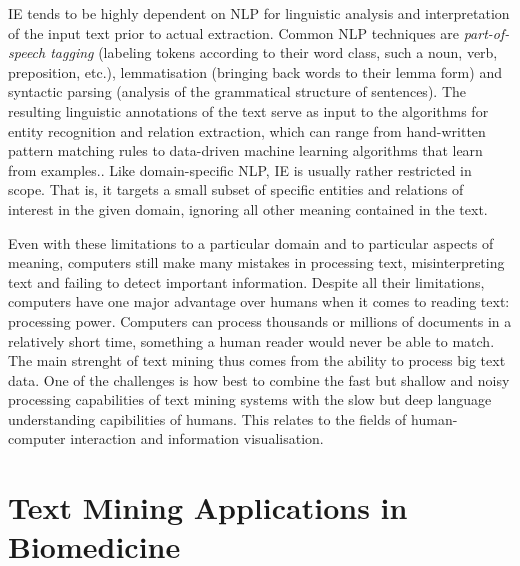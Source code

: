 IE tends to be highly dependent on NLP for linguistic analysis and interpretation of the input text prior to actual extraction.
Common NLP techniques are \emph{part-of-speech tagging} (labeling tokens according to their word class, such a noun, verb, preposition, etc.), lemmatisation (bringing back words to their lemma form) and syntactic parsing (analysis of the grammatical structure of sentences).
The resulting linguistic annotations of the text serve as input to the algorithms for entity recognition and relation extraction, which can range from hand-written pattern matching rules to data-driven machine learning algorithms that learn from examples..
Like domain-specific NLP, IE is usually rather restricted in scope.
That is, it targets a small subset of specific entities and relations of interest in the given domain, ignoring all other meaning contained in the text.    

Even with these limitations to a particular domain and to particular aspects of meaning, computers still make many mistakes in processing text, misinterpreting text and failing to detect important information.
Despite all their limitations, computers have one major advantage over humans when it comes to reading text: processing power.
Computers can process thousands or millions of documents in a relatively short time, something a human reader would never be able to match.
The main strenght of text mining thus comes from the ability to process big text data.
One of the challenges is how best to combine the fast but shallow and noisy processing capabilities of text mining systems with the slow but deep language understanding capibilities of humans.
This relates to the fields of human-computer interaction and information visualisation.   

\section{Text Mining Applications in Biomedicine}
\label{sec:tm-biomed}

